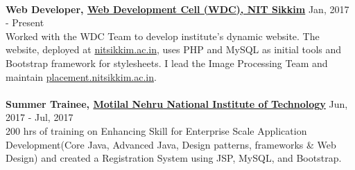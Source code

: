 \documentclass[margin, centered]{res}
\begin{document}
\begin{resume}
            \\
            \textbf{Web Developer, \href{https://nitsikkim.ac.in/webdevelopmentcell}{Web Development Cell (WDC), NIT Sikkim}} \hfill Jan, 2017 - Present \\
            Worked with the WDC Team to develop institute's dynamic website. The website, deployed at
            \href{https://www.nitsikkim.ac.in}{nitsikkim.ac.in}, uses PHP and MySQL as initial tools
            and Bootstrap framework for stylesheets. I lead the Image Processing Team and maintain
            \href{https://placement.nitsikkim.ac.in}{placement.nitsikkim.ac.in}. \\
            \\
            \textbf{Summer Trainee, \href{http://www.mnnit.ac.in/}{Motilal Nehru National Institute of Technology}} \hfill Jun, 2017 - Jul, 2017 \\
            200 hrs of training on Enhancing Skill for Enterprise Scale Application Development(Core
            Java, Advanced Java, Design patterns, frameworks \& Web Design) and created a Registration
            System using JSP, MySQL, and Bootstrap.



\end{resume}
\end{document}
